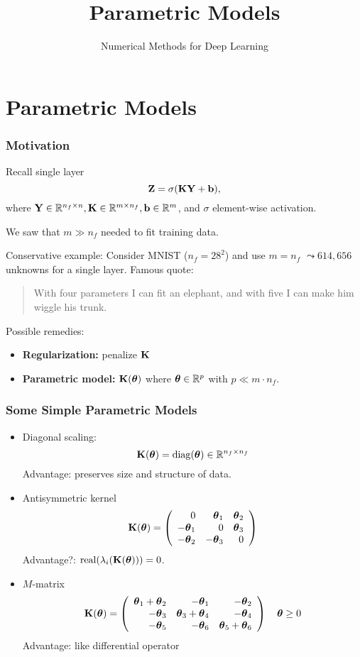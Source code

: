 \documentclass[12pt,fleqn,handout]{beamer}
\title{Parametric Models}
\subtitle{Numerical Methods for Deep Learning}
\date{}
\begin{document}
\makebeamertitle

\section{Parametric Models} %
\label{sec:parametric_models}
\begin{frame}[fragile]\frametitle{Motivation}

Recall single layer
$$
	{\bf Z} = \sigma({\bf K}{\bf Y} + {\bf b}),
$$
where ${\bf Y} \in \mathbb{R}^{n_f\times n}, {\bf K} \in \mathbb{R}^{m \times n_f}, {\bf b}\in\mathbb{R}^m$, and $\sigma$ element-wise activation. 

\bigskip
\pause

We saw that $m \gg n_f$ needed to fit training data. 

Conservative example: Consider MNIST ($n_f = 28^2$) and use $m=n_f$ $\leadsto 614,656$ unknowns for a single layer. \pause Famous quote:

\begin{quote}
	With four parameters I can fit an elephant, and with five I can make him wiggle his trunk.
\end{quote}

\bigskip
\pause

Possible remedies:
\begin{itemize}
	\item \textbf{Regularization:} penalize ${\bf K}$ 
	\item \textbf{Parametric model:} ${\bf K}({\boldsymbol \theta})$ where ${\boldsymbol \theta}\in\mathbb{R}^p$ with $p\ll m\cdot n_f$.
\end{itemize}
\end{frame}


\begin{frame}\frametitle{Some Simple Parametric Models}
	
	\begin{itemize}
		\item Diagonal scaling:
		$$
			{\bf K}({\boldsymbol \theta}) = {\rm diag}({\boldsymbol \theta}) \in \mathbb{R}^{n_f\times n_f}
		$$
		Advantage: preserves size and structure of data.
		\pause
		\item Antisymmetric kernel
		$$
			{\bf K}({\boldsymbol \theta}) = \left(
				\begin{array}{rrr}
					0 & {\boldsymbol \theta}_1 & {\boldsymbol \theta}_2 \\
					-{\boldsymbol \theta}_1 & 0 & {\boldsymbol \theta}_3 \\
					-{\boldsymbol \theta}_2 & -{\boldsymbol \theta}_3 & 0
				\end{array}
			\right)
		$$
		Advantage?: ${\rm real}(\lambda_i({\bf K}({\boldsymbol \theta}))) = 0$. 
		\pause
		\item $M$-matrix
		$$
		{\bf K}({\boldsymbol \theta}) = \left(
				\begin{array}{rrr}
					{\boldsymbol \theta}_1+{\boldsymbol \theta}_2 & -{\boldsymbol \theta}_1 & -{\boldsymbol \theta}_2 \\
					-{\boldsymbol \theta}_3 & {\boldsymbol \theta}_3 + {\boldsymbol \theta}_4 & -{\boldsymbol \theta}_4 \\
					-{\boldsymbol \theta}_5 & -{\boldsymbol \theta}_6 & {\boldsymbol \theta}_5+{\boldsymbol \theta}_6
				\end{array}
			\right)
			\quad {\boldsymbol \theta} \geq 0
		$$
		Advantage: like differential operator
	\end{itemize}
\end{frame}
\end{document}
